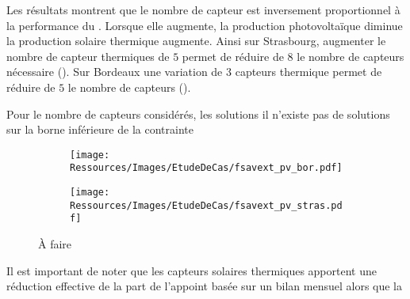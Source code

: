 
Les résultats montrent que le nombre de capteur  est inversement proportionnel
à la performance du . Lorsque elle augmente, la production photovoltaïque
diminue la production solaire thermique augmente. Ainsi sur Strasbourg, augmenter
le nombre de capteur thermiques de $5$ permet de réduire de $8$ le nombre de
capteurs  nécessaire (). Sur Bordeaux une variation de $3$ capteurs
thermique permet de réduire de $5$ le nombre de capteurs  ().

Pour le nombre de capteurs  considérés, les solutions  il n’existe pas de solutions
sur la borne inférieure de la contrainte



\begin{figure}
    \centering
    \begin{subfigure}[b]{0.48\textwidth}
        \centering
        \texttt{[image: Ressources/Images/EtudeDeCas/fsavext\_pv\_bor.pdf]}
        \caption{}
        \label{fig:fsav_pv_bor}
    \end{subfigure}
    \quad
    \begin{subfigure}[b]{0.48\textwidth}
        \centering
        \texttt{[image: Ressources/Images/EtudeDeCas/fsavext\_pv\_stras.pdf]}
        \caption{}
        \label{fig:fsav_pv_stras}
    \end{subfigure}
    \caption[À faire]
             {À faire}
    \label{fig:fsav_pv_bor_stras}
\end{figure}




Il est important de noter que les capteurs solaires thermiques
apportent une réduction
effective de la part de l’appoint basée sur un bilan mensuel alors que la



